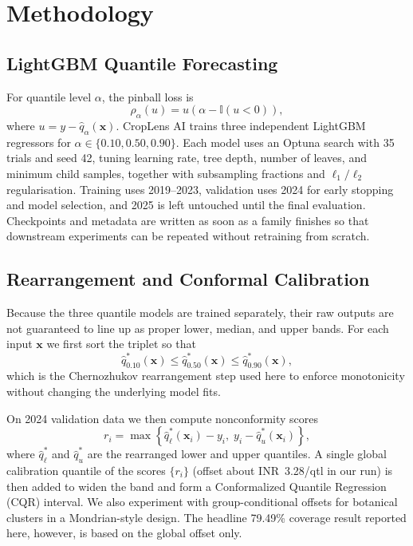 \documentclass[a4paper,conference]{IEEEtran}
\begin{document}
\section{Methodology}

\subsection{LightGBM Quantile Forecasting}
For quantile level $\alpha$, the pinball loss is
\begin{equation}
\rho_{\alpha}(u) = u \left(\alpha - \mathbb{I}(u < 0)\right),
\label{eq:pinball}
\end{equation}
where $u = y - \hat{q}_{\alpha}(\mathbf{x})$. CropLens AI trains three independent LightGBM regressors for $\alpha \in \{0.10, 0.50, 0.90\}$. Each model uses an Optuna search with 35 trials and seed 42, tuning learning rate, tree depth, number of leaves, and minimum child samples, together with subsampling fractions and $\ell_1/\ell_2$ regularisation. Training uses 2019--2023, validation uses 2024 for early stopping and model selection, and 2025 is left untouched until the final evaluation. Checkpoints and metadata are written as soon as a family finishes so that downstream experiments can be repeated without retraining from scratch.

\subsection{Rearrangement and Conformal Calibration}
Because the three quantile models are trained separately, their raw outputs are not guaranteed to line up as proper lower, median, and upper bands. For each input $\mathbf{x}$ we first sort the triplet so that
\begin{equation}
\hat{q}^{*}_{0.10}(\mathbf{x}) \le \hat{q}^{*}_{0.50}(\mathbf{x}) \le \hat{q}^{*}_{0.90}(\mathbf{x}),
\label{eq:order}
\end{equation}
which is the Chernozhukov rearrangement step used here to enforce monotonicity without changing the underlying model fits.

On 2024 validation data we then compute nonconformity scores
\begin{equation}
r_i = \max\left\{\hat{q}^{*}_{\ell}(\mathbf{x}_i) - y_i,\; y_i - \hat{q}^{*}_{u}(\mathbf{x}_i)\right\},
\label{eq:conformal}
\end{equation}
where $\hat{q}^{*}_{\ell}$ and $\hat{q}^{*}_{u}$ are the rearranged lower and upper quantiles. A single global calibration quantile of the scores $\{r_i\}$ (offset about INR~3.28/qtl in our run) is then added to widen the band and form a Conformalized Quantile Regression (CQR) interval. We also experiment with group-conditional offsets for botanical clusters in a Mondrian-style design. The headline 79.49\% coverage result reported here, however, is based on the global offset only.
\end{document}
